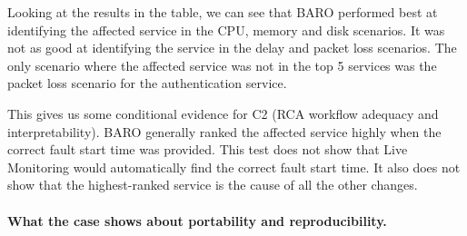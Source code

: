 
Looking at the results in the table, we can see that BARO performed best at identifying the affected service in the CPU, memory and disk scenarios. It was not as good at identifying the service in the delay and packet loss scenarios. The only scenario where the affected service was not in the top 5 services was the packet loss scenario for the authentication service.

This gives us some conditional evidence for C2 (RCA workflow adequacy and interpretability). BARO generally ranked the affected service highly when the correct fault start time was provided. This test does not show that Live Monitoring would automatically find the correct fault start time. It also does not show that the highest-ranked service is the cause of all the other changes.

\paragraph{What the case shows about portability and reproducibility.}



